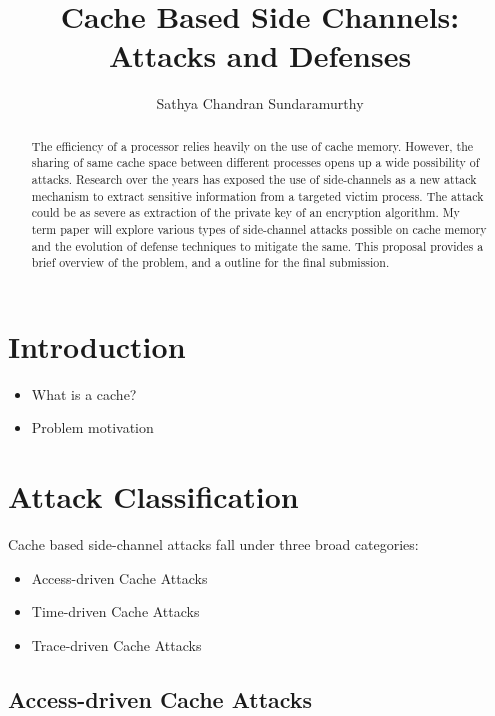 \documentclass[onecolumn]{IEEEtran}
\title{Cache Based Side Channels: Attacks and Defenses}
\author{Sathya Chandran Sundaramurthy}
\begin{document}
\maketitle
\begin{abstract}
The efficiency of a processor relies heavily on the use of cache
memory.  However, the sharing of same cache space between different
processes opens up a wide possibility of attacks.  Research over the
years has exposed the use of side-channels as a new attack mechanism
to extract sensitive information from a targeted victim process. The
attack could be as severe as extraction of the private key of an
encryption algorithm.  My term paper will explore various types of
side-channel attacks possible on cache memory and the evolution of
defense techniques to mitigate the same.  This proposal provides a
brief overview of the problem, and a outline for the final submission.
\end{abstract}
\section{Introduction}

\begin{itemize}
\item What is a cache?
\item Problem motivation
\end{itemize}

\section{Attack Classification}

Cache based side-channel attacks fall under three broad categories:

\begin{itemize}
\item Access-driven Cache Attacks
\item Time-driven Cache Attacks
\item Trace-driven Cache Attacks
\end{itemize}

\subsection{Access-driven Cache Attacks}
\end{document}
